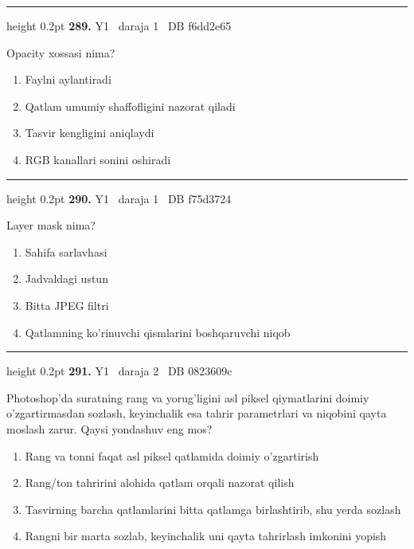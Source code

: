 \documentclass[10pt,a4paper,oneside]{article}
\begin{document}
\vspace{2mm}\hrule height 0.2pt \vspace{4mm}
\hypertarget{q289}{\textbf{\color{ink}289.}}  {\color{muted}\scriptsize Y1 \textbullet\ daraja 1 \textbullet\ DB f6dd2e65}
\par
Opacity xossasi nima?
\begin{enumerate}[label=\Alph*),leftmargin=9mm]
\item Faylni aylantiradi
\item Qatlam umumiy shaffofligini nazorat qiladi
\item Tasvir kengligini aniqlaydi
\item RGB kanallari sonini oshiradi
\end{enumerate}
\vspace{2mm}\hrule height 0.2pt \vspace{4mm}
\hypertarget{q290}{\textbf{\color{ink}290.}}  {\color{muted}\scriptsize Y1 \textbullet\ daraja 1 \textbullet\ DB f75d3724}
\par
Layer mask nima?
\begin{enumerate}[label=\Alph*),leftmargin=9mm]
\item Sahifa sarlavhasi
\item Jadvaldagi ustun
\item Bitta JPEG filtri
\item Qatlamning ko'rinuvchi qismlarini boshqaruvchi niqob
\end{enumerate}
\vspace{2mm}\hrule height 0.2pt \vspace{4mm}
\hypertarget{q291}{\textbf{\color{ink}291.}}  {\color{muted}\scriptsize Y1 \textbullet\ daraja 2 \textbullet\ DB 0823609c}
\par
Photoshop'da suratning rang va yorug'ligini asl piksel qiymatlarini doimiy o'zgartirmasdan sozlash, keyinchalik esa tahrir parametrlari va niqobini qayta moslash zarur. Qaysi yondashuv eng mos?
\begin{enumerate}[label=\Alph*),leftmargin=9mm]
\item Rang va tonni faqat asl piksel qatlamida doimiy o'zgartirish
\item Rang/ton tahririni alohida qatlam orqali nazorat qilish
\item Tasvirning barcha qatlamlarini bitta qatlamga birlashtirib, shu yerda sozlash
\item Rangni bir marta sozlab, keyinchalik uni qayta tahrirlash imkonini yopish
\end{enumerate}
\end{document}
